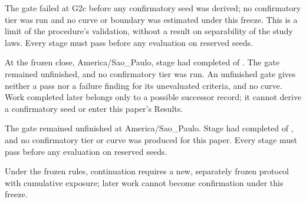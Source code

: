 The gate failed at G2c before any confirmatory seed was derived; no confirmatory tier was run and no curve or boundary was estimated under this freeze. %
This is a limit of the procedure's validation, without a result on separability of the study laws. %
Every stage must pass before any evaluation on reserved seeds. %

At the frozen close,  America/Sao\_Paulo, stage  had completed  of  . The gate remained unfinished, and no confirmatory tier was run. %
An unfinished gate gives neither a pass nor a failure finding for its unevaluated criteria, and no curve. Work completed later belongs only to a possible successor record; it cannot derive a confirmatory seed or enter this paper's Results. %

The gate remained unfinished at  America/Sao\_Paulo. Stage  had completed  of  , and no confirmatory tier or curve was produced for this paper. %
Every stage must pass before any evaluation on reserved seeds. %

Under the frozen rules, continuation requires a new, separately frozen protocol with cumulative exposure; later work cannot become confirmation under this freeze. %
